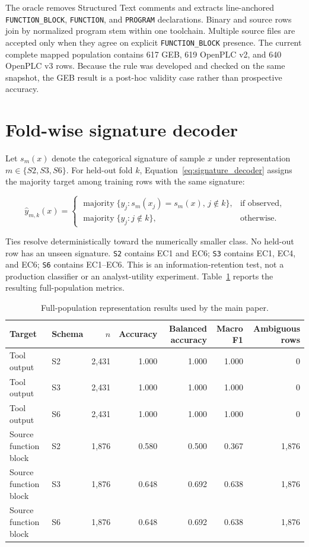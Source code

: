 \documentclass[manuscript,screen,review]{acmart}
\begin{document}
The oracle removes Structured Text comments and extracts line-anchored \texttt{FUNCTION\_BLOCK}, \texttt{FUNCTION}, and \texttt{PROGRAM} declarations. Binary and source rows join by normalized program stem within one toolchain. Multiple source files are accepted only when they agree on explicit \texttt{FUNCTION\_BLOCK} presence. The current complete mapped population contains 617 GEB, 619 OpenPLC v2, and 640 OpenPLC v3 rows. Because the rule was developed and checked on the same snapshot, the GEB result is a post-hoc validity case rather than prospective accuracy.

\section{Fold-wise signature decoder}

Let $s_m(x)$ denote the categorical signature of sample $x$ under representation $m\in\{S2,S3,S6\}$. For held-out fold $k$, Equation~\eqref{eq:signature_decoder} assigns the majority target among training rows with the same signature:

\begin{equation}
\label{eq:signature_decoder}
\widehat{y}_{m,k}(x)=
\begin{cases}
\operatorname{majority}\{y_j:s_m(x_j)=s_m(x),\,j\notin k\}, & \text{if observed},\\
\operatorname{majority}\{y_j:j\notin k\}, & \text{otherwise}.
\end{cases}
\end{equation}

Ties resolve deterministically toward the numerically smaller class. No held-out row has an unseen signature. \texttt{S2} contains EC1 and EC6; \texttt{S3} contains EC1, EC4, and EC6; \texttt{S6} contains EC1--EC6. This is an information-retention test, not a production classifier or an analyst-utility experiment. Table~\ref{tab:schema_results} reports the resulting full-population metrics.

\begin{table}[t]
\centering
\small
\caption{Full-population representation results used by the main paper.}
\label{tab:schema_results}
\begin{tabularx}{\textwidth}{>{\raggedright\arraybackslash}Xlrrrrr}
\toprule
Target & Schema & $n$ & Accuracy & Balanced accuracy & Macro F1 & Ambiguous rows \\
\midrule
Tool output & S2 & 2,431 & 1.000 & 1.000 & 1.000 & 0 \\
Tool output & S3 & 2,431 & 1.000 & 1.000 & 1.000 & 0 \\
Tool output & S6 & 2,431 & 1.000 & 1.000 & 1.000 & 0 \\
Source function block & S2 & 1,876 & 0.580 & 0.500 & 0.367 & 1,876 \\
Source function block & S3 & 1,876 & 0.648 & 0.692 & 0.638 & 1,876 \\
Source function block & S6 & 1,876 & 0.648 & 0.692 & 0.638 & 1,876 \\
\bottomrule
\end{tabularx}
\end{table}
\end{document}
